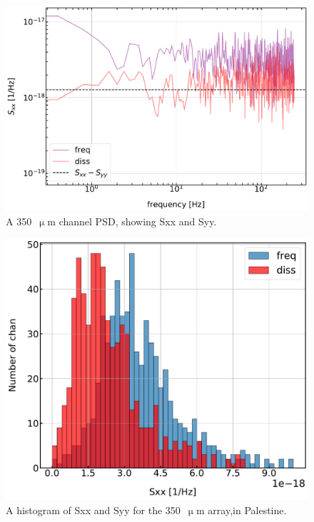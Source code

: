 \begin{figure}[!htbp]
\centering
\includegraphics[width=\textwidth]{figures/blast_data/timestreams/350_448_freq_diss_psd}
\caption[~A 350~ channel PSD, showing the phase and dissipation quadratures.]{A 350~$\upmu$m channel PSD, showing \gls{Sxx} and \gls{Syy}.}
\label{fig:350 chan 448 psd}
\end{figure}

\begin{figure}[!htbp]
\centering
\includegraphics[width=\textwidth]{figures/blast_data/timestreams/350_pal_Sxx_hist_448}
\caption[~A histogram of frequency and dissipation noise for the 350~ array, in Palestine.]{A histogram of \gls{Sxx} and \gls{Syy} for the 350~$\upmu$m array,in Palestine.}
\label{fig:350 freq diss}
\end{figure}

